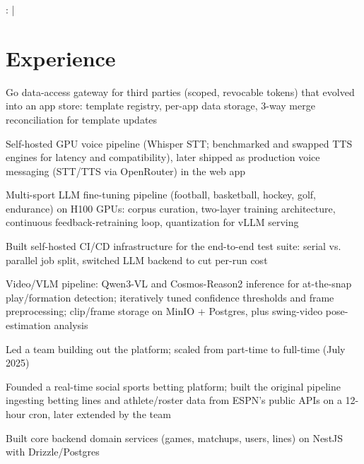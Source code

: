 \documentclass[print]{jack-resume}
\begin{document}
\raggedright{
    :
      \href{https://www.linkedin.com/in/jack-sturtevant/}{ \ExternalLink} |
     \href{https://github.com/jacksturt}{ \ExternalLink}}


\section{Experience}

\begin{tightemize}
    \item Go data-access gateway for third parties (scoped, revocable tokens) that evolved into an app store: template registry, per-app data storage, 3-way merge reconciliation for template updates
    \item Self-hosted GPU voice pipeline (Whisper STT; benchmarked and swapped TTS engines for latency and compatibility), later shipped as production voice messaging (STT/TTS via OpenRouter) in the web app
    \item Multi-sport LLM fine-tuning pipeline (football, basketball, hockey, golf, endurance) on H100 GPUs: corpus curation, two-layer training architecture, continuous feedback-retraining loop, quantization for vLLM serving
    \item Built self-hosted CI/CD infrastructure for the end-to-end test suite: serial vs. parallel job split, switched LLM backend to cut per-run cost
    \item Video/VLM pipeline: Qwen3-VL and Cosmos-Reason2 inference for at-the-snap play/formation detection; iteratively tuned confidence thresholds and frame preprocessing; clip/frame storage on MinIO + Postgres, plus swing-video pose-estimation analysis
\end{tightemize}
\sectionsep

\begin{tightemize}
    \item Led a team building out the platform; scaled from part-time to full-time (July 2025)
    \item Founded a real-time social sports betting platform; built the original pipeline ingesting betting lines and athlete/roster data from ESPN's public APIs on a 12-hour cron, later extended by the team
    \item Built core backend domain services (games, matchups, users, lines) on NestJS with Drizzle/Postgres
\end{tightemize}
\sectionsep
\end{document}
